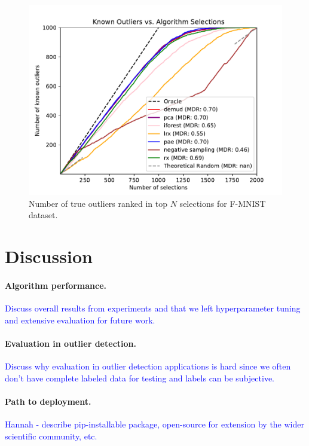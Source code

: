 \documentclass[letterpaper]{article} %
\newcommand{\todo}[1]{\textcolor{blue}{#1}}
\begin{document}
\begin{figure}
    \centering
    \includegraphics[width=\linewidth]{figures/fmnist_combined_plot.pdf}
    \caption{Number of true outliers ranked in top $N$ selections for 
    F-MNIST dataset.}
    \label{fig:fmnist_results}
\end{figure}

\section{Discussion}

\paragraph{Algorithm performance.} \todo{Discuss overall results from
 experiments and that we left hyperparameter tuning and extensive
 evaluation for future work.}
 
\paragraph{Evaluation in outlier detection.} \todo{Discuss why evaluation
in outlier detection applications is hard since we often don't have complete
labeled data for testing and labels can be subjective.}

\paragraph{Path to deployment.} \todo{Hannah - describe pip-installable
package, open-source for extension by the wider scientific community, etc.}
\end{document}

